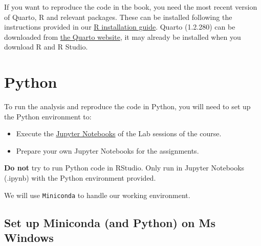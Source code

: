 \documentclass[
  letterpaper,
  DIV=11,
  numbers=noendperiod]{scrreprt}
\providecommand{\tightlist}{%
  \setlength{\itemsep}{0pt}\setlength{\parskip}{0pt}}\usepackage{longtable,booktabs,array}
\begin{document}

If you want to reproduce the code in the book, you need the most recent
version of Quarto, R and relevant packages. These can be installed
following the instructions provided in our
\href{https://gdsl-ul.github.io/r_install/}{R installation guide}.
Quarto (1.2.280) can be downloaded from
\href{https://quarto.org/docs/get-started/}{the Quarto website}, it may
already be installed when you download R and R Studio.

\chapter*{Python}\label{python}


To run the analysis and reproduce the code in Python, you will need to
set up the Python environment to:

\begin{itemize}
\tightlist
\item
  Execute the \href{https://docs.jupyter.org/en/latest/}{Jupyter
  Notebooks} of the Lab sessions of the course.
\item
  Prepare your own Jupyter Notebooks for the assignments.
\end{itemize}

\begin{tcolorbox}[enhanced jigsaw, breakable, toptitle=1mm, titlerule=0mm, opacityback=0, colback=white, coltitle=black, leftrule=.75mm, bottomtitle=1mm, colframe=quarto-callout-important-color-frame, colbacktitle=quarto-callout-important-color!10!white, toprule=.15mm, bottomrule=.15mm, arc=.35mm, rightrule=.15mm, opacitybacktitle=0.6, title=\textcolor{quarto-callout-important-color}{\faExclamation}\hspace{0.5em}{Important}, left=2mm]

\textbf{Do not} try to run Python code in RStudio. Only run in Jupyter
Notebooks (.ipynb) with the Python environment provided.

\end{tcolorbox}

We will use \texttt{Miniconda} to handle our working environment.

\section*{Set up Miniconda (and Python) on Ms
Windows}\label{set-up-miniconda-and-python-on-ms-windows}
\end{document}
